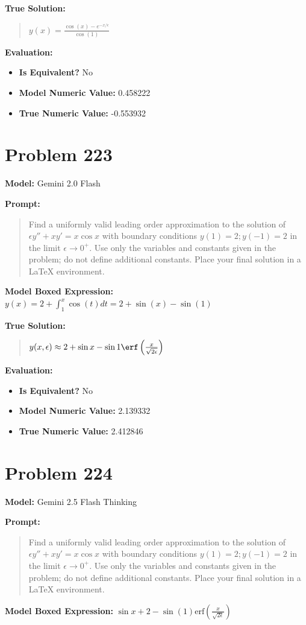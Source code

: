 \documentclass{article}
\begin{document}
{\textbf{True Solution:}
\begin{quote}
$y(x) = \frac{\cos(x)- e^{-x/\epsilon}}{\cos(1)}$
\end{quote}

\textbf{Evaluation:}
\begin{itemize}
\item \textbf{Is Equivalent?} No
\item \textbf{Model Numeric Value:} 0.458222
\item \textbf{True Numeric Value:} -0.553932
\end{itemize}
\vspace{1cm}
\section*{Problem 223}
\textbf{Model:} Gemini 2.0 Flash

\textbf{Prompt:}
\begin{quote}
Find a uniformly valid leading order approximation to the solution of $\epsilon y'' + xy' = x \cos{x}$ with boundary conditions $y(1) = 2; y(-1) = 2$ in the limit $\epsilon \to 0^+$. Use only the variables and constants given in the problem; do not define additional constants. Place your final solution in a $\boxed{}$ LaTeX environment.
\end{quote}
\textbf{Model Boxed Expression:} $y(x) = 2 + \int_1^x \cos(t) dt = 2 + \sin(x) - \sin(1)$

\textbf{True Solution:}
\begin{quote}
$y(x,\epsilon) \approx 2 + \sin x - \sin 1 \erf \left(\frac{x}{\sqrt{2\epsilon}}\right)$
\end{quote}

\textbf{Evaluation:}
\begin{itemize}
\item \textbf{Is Equivalent?} No
\item \textbf{Model Numeric Value:} 2.139332
\item \textbf{True Numeric Value:} 2.412846
\end{itemize}
\vspace{1cm}
\section*{Problem 224}
\textbf{Model:} Gemini 2.5 Flash Thinking

\textbf{Prompt:}
\begin{quote}
Find a uniformly valid leading order approximation to the solution of $\epsilon y'' + xy' = x \cos{x}$ with boundary conditions $y(1) = 2; y(-1) = 2$ in the limit $\epsilon \to 0^+$. Use only the variables and constants given in the problem; do not define additional constants. Place your final solution in a $\boxed{}$ LaTeX environment.
\end{quote}
\textbf{Model Boxed Expression:} $\sin x + 2 - \sin(1)\text{erf}\left(\frac{x}{\sqrt{2\epsilon}}\right)$

}
\end{document}
